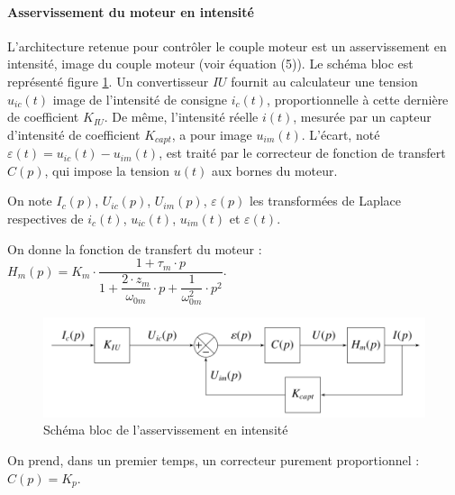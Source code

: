 
\paragraph{Asservissement du moteur en intensité}

L'architecture retenue pour contrôler le couple moteur est un asservissement en intensité, image du
couple moteur (voir équation (5)). Le schéma bloc est représenté figure \ref{fig10}. Un convertisseur $IU$
fournit au calculateur une tension $u_{ic}(t)$ image de l'intensité de consigne $i_c(t)$, proportionnelle à cette dernière de coefficient $K_{IU}$. De même, l'intensité réelle $i(t)$, mesurée par un capteur d'intensité de coefficient $K_{capt}$, a pour image $u_{im}(t)$. L'écart, noté $\varepsilon(t)=u_{ic}(t)- u_{im}(t)$, est traité par le correcteur de fonction de transfert $C(p)$, qui impose la tension $u(t)$ aux bornes du moteur.

On note $I_c(p)$, $U_{ic}(p)$, $U_{im}(p)$, $\varepsilon(p)$ les transformées de Laplace respectives de $i_c(t)$, $u_{ic}(t)$, $u_{im}(t)$ et $\varepsilon(t)$.

On donne la fonction de transfert du moteur : $H_m(p)=K_m\cdot \dfrac{1+\tau_m\cdot p}{1+\dfrac{2\cdot z_m}{\omega_{0m}}\cdot p+\dfrac{1}{\omega^2_{0m}}\cdot p^2}$.

\begin{figure}[ht!]
 \begin{center}
 \includegraphics[width=.8\linewidth]{img/fig10}
 \caption{\label{fig10}Schéma bloc de l'asservissement en intensité}
 \end{center}
\end{figure}


On prend, dans un premier temps, un correcteur purement proportionnel : $C(p)=K_p$.

